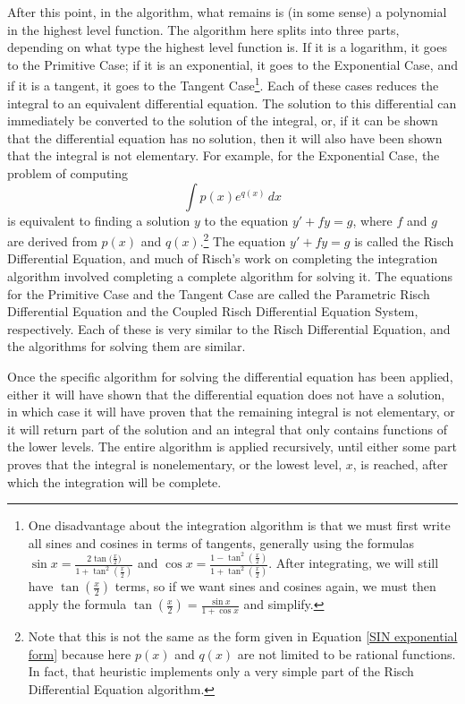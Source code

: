 After this point, in the algorithm, what remains is (in some sense) a
polynomial in the highest level function.  The algorithm here splits
into three parts, depending on what type the highest level function is.  If it
is a logarithm, it goes to the Primitive Case; if it is an exponential,
it goes to the Exponential Case, and if it is a tangent, it goes to the
Tangent Case\footnote{One disadvantage about the \gls{integration} algorithm
is that we must first write all sines and cosines in terms of tangents,
generally using the formulas $\sin{x} = \frac{2\tan{(\frac{x}{2}})}{1 +
\tan^2{(\frac{x}{2})}}$ and $\cos{x} = \frac{1 -
\tan^2{(\frac{x}{2})}}{1 + \tan^2{(\frac{x}{2})}}$.  After integrating,
we will still have $\tan{(\frac{x}{2})}$ terms, so if we want sines and
cosines again, we must then apply the formula $\tan{(\frac{x}{2})} =
\frac{\sin{x}}{1 + \cos{x}}$ and simplify.}.  Each of these cases
reduces the integral to an equivalent differential equation.  The
solution to this differential can immediately be converted to the
solution of the integral, or, if it can be shown that the differential
equation has no solution, then it will also have been shown that the
integral is not \gls{elementary}.  For example, for the Exponential
Case, the problem of computing
\begin{equation}
\label{exponential case}
\int{p(x)e^{q(x)}\,dx}
\end{equation}
is equivalent to finding a solution $y$ to the equation $y' + fy = g$,
where $f$ and $g$ are derived from $p(x)$ and $q(x)$.\footnote{Note that
this is not the same as the form given in Equation \ref{SIN exponential
form} because here $p(x)$ and $q(x)$ are not limited to be
\glspl{rational function}.  In fact, that heuristic implements only a
very simple part of the Risch Differential Equation algorithm.}  The
equation $y' + fy = g$ is called the Risch Differential Equation, and
much of Risch's work on completing the \gls{integration} algorithm
involved completing a complete algorithm for solving it.  The equations
for the Primitive Case and the Tangent Case are called the Parametric
Risch Differential Equation and the Coupled Risch Differential Equation
System, respectively.  Each of these is very similar to the Risch
Differential Equation, and the algorithms for solving them are similar.

Once the specific algorithm for solving the differential equation has
been applied, either it will have shown that the differential equation
does not have a solution, in which case it will have proven that the
remaining integral is not \gls{elementary}, or it will return part of
the solution and an integral that only contains functions of the lower
levels.  The entire algorithm is applied recursively, until either some
part proves that the integral is nonelementary, or the lowest level,
$x$, is reached, after which the \gls{integration} will be complete.

